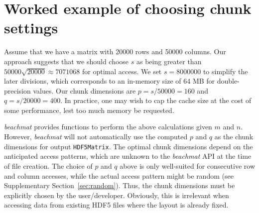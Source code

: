 \documentclass{article}
\begin{document}


%

\section{Worked example of choosing chunk settings}
Assume that we have a matrix with 20000 rows and 50000 columns.
Our approach suggests that we should choose $s$ as being greater than $50000\sqrt{20000} \approx 7071068$ for optimal access.
We set $s=8000000$ to simplify the later divisions, which corresponds to an in-memory size of 64 MB for double-precision values.
Our chunk dimensions are $p = s/50000 = 160$ and $q = s/20000 = 400$.
In practice, one may wish to cap the cache size at the cost of some performance, lest too much memory be requested.

\textit{beachmat} provides functions to perform the above calculations given $m$ and $n$.
However, \textit{beachmat} will not automatically use the computed $p$ and $q$ as the chunk dimensions for output \texttt{HDF5Matrix}.
The optimal chunk dimensions depend on the anticipated access patterns, which are unknown to the \textit{beachmat} API at the time of file creation.
The choice of $p$ and $q$ above is only well-suited for consecutive row and column accesses, while the actual access pattern might be random (see Supplementary Section~\ref{sec:random}).
Thus, the chunk dimensions must be explicitly chosen by the user/developer.
Obviously, this is irrelevant when accessing data from existing HDF5 files where the layout is already fixed.
\end{document}
